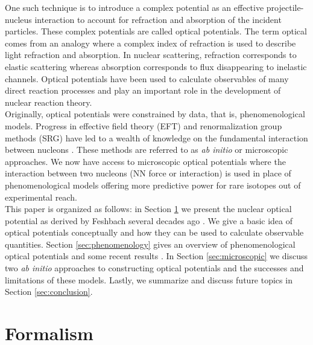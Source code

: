 \documentclass[preprintnumbers,floatfix,aps,prc,preprint,nofootinbib]{revtex4-1}
\begin{document}
One such technique is to introduce a complex potential as an effective projectile-nucleus interaction to account for refraction and absorption of the incident particles. These complex potentials are called optical potentials. The term optical comes from an analogy where a complex index of refraction is used to describe light refraction and absorption. In nuclear scattering, refraction corresponds to elastic scattering whereas absorption corresponds to flux disappearing to inelastic channels. Optical potentials have been used to calculate observables of many direct reaction processes and play an important role in the development of nuclear reaction theory.
\\

Originally, optical potentials were constrained by data, that is, phenomenological models. Progress in effective field theory (EFT) and renormalization group methods (SRG) have led to a wealth of knowledge on the fundamental interaction between nucleons \cite{Epelbaum:2008ga}. These methods are referred to as \textit{ab initio} or microscopic approaches. We now have access to microscopic optical potentials where the interaction between two nucleons (NN force or interaction) is used in place of phenomenological models offering more predictive power for rare isotopes out of experimental reach.
\\

This paper is organized as follows: in Section \ref{sec:formalism} we present the nuclear optical potential as derived by Feshbach several decades ago \cite{Feshbach:1958nx, Feshbach:1962ut}. We give a basic idea of optical potentials conceptually and how they can be used to calculate observable quantities. Section \ref{sec:phenomenology} gives an overview of phenomenological optical potentials and some recent results \cite{Koning:2003zz}. In Section \ref{sec:microscopic} we discuss two \textit{ab initio} approaches to constructing optical potentials and the successes and limitations of these models. Lastly, we summarize and discuss future topics in Section \ref{sec:conclusion}.


\section{Formalism}
\label{sec:formalism}
\end{document}
